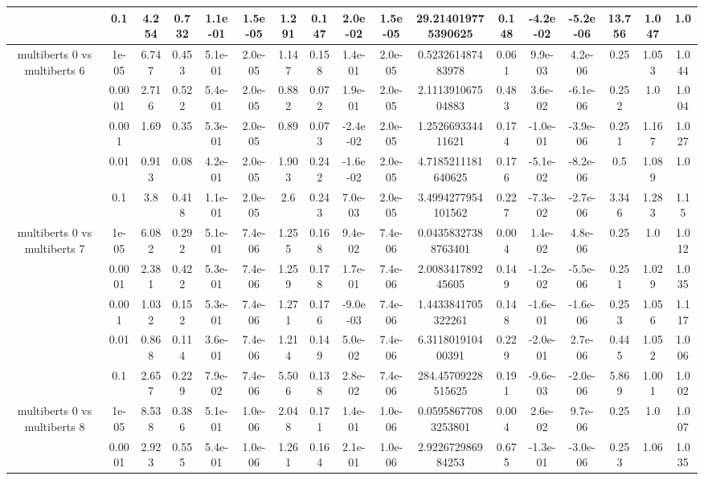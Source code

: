 \begin{tabular}{|c|c|c|c|c|c|c|c|c|c|c|c|c|c|c|c|c|}
 & 0.1 & 4.254 & 0.732 & 1.1e-01 & 1.5e-05 & 1.291 & 0.147 & 2.0e-02 & 1.5e-05 & 29.214019775390625 & 0.148 & -4.2e-02 & -5.2e-06 & 13.756 & 1.047 & 1.0 \\
\hline
\multirow{5}{*}{multiberts 0 vs multiberts 6} & 1e-05 & 6.747 & 0.453 & 5.1e-01 & 2.0e-05 & 1.147 & 0.158 & 1.4e-01 & 2.0e-05 & 0.523261487483978 & 0.061 & 9.9e-03 & 4.2e-06 & 0.25 & 1.053 & 1.044 \\
 & 0.0001 & 2.716 & 0.522 & 5.4e-01 & 2.0e-05 & 0.882 & 0.072 & 1.9e-01 & 2.0e-05 & 2.111391067504883 & 0.483 & 3.6e-02 & -6.1e-06 & 0.252 & 1.0 & 1.004 \\
 & 0.001 & 1.69 & 0.35 & 5.3e-01 & 2.0e-05 & 0.89 & 0.073 & -2.4e-02 & 2.0e-05 & 1.252669334411621 & 0.174 & -1.0e-01 & -3.9e-06 & 0.251 & 1.167 & 1.027 \\
 & 0.01 & 0.913 & 0.08 & 4.2e-01 & 2.0e-05 & 1.903 & 0.242 & -1.6e-02 & 2.0e-05 & 4.7185211181640625 & 0.176 & -5.1e-02 & -8.2e-06 & 0.5 & 1.089 & 1.0 \\
 & 0.1 & 3.8 & 0.418 & 1.1e-01 & 2.0e-05 & 2.6 & 0.243 & 7.0e-03 & 2.0e-05 & 3.4994277954101562 & 0.227 & -7.3e-02 & -2.7e-06 & 3.346 & 1.283 & 1.15 \\
\hline
\multirow{5}{*}{multiberts 0 vs multiberts 7} & 1e-05 & 6.082 & 0.292 & 5.1e-01 & 7.4e-06 & 1.255 & 0.168 & 9.4e-02 & 7.4e-06 & 0.04358327388763401 & 0.004 & 1.4e-02 & 4.8e-06 & 0.25 & 1.0 & 1.012 \\
 & 0.0001 & 2.381 & 0.422 & 5.3e-01 & 7.4e-06 & 1.259 & 0.178 & 1.7e-01 & 7.4e-06 & 2.008341789245605 & 0.149 & -1.2e-02 & -5.5e-06 & 0.251 & 1.029 & 1.035 \\
 & 0.001 & 1.032 & 0.152 & 5.3e-01 & 7.4e-06 & 1.271 & 0.176 & -9.0e-03 & 7.4e-06 & 1.4433841705322261 & 0.148 & -1.6e-01 & -1.6e-06 & 0.253 & 1.056 & 1.117 \\
 & 0.01 & 0.868 & 0.114 & 3.6e-01 & 7.4e-06 & 1.214 & 0.149 & 5.0e-02 & 7.4e-06 & 6.311801910400391 & 0.229 & -2.0e-01 & 2.7e-06 & 0.445 & 1.052 & 1.006 \\
 & 0.1 & 2.657 & 0.229 & 7.9e-02 & 7.4e-06 & 5.506 & 0.138 & 2.8e-02 & 7.4e-06 & 284.45709228515625 & 0.191 & -9.6e-03 & -2.0e-06 & 5.869 & 1.001 & 1.002 \\
\hline
\multirow{5}{*}{multiberts 0 vs multiberts 8} & 1e-05 & 8.538 & 0.386 & 5.1e-01 & 1.0e-06 & 2.048 & 0.171 & 1.4e-01 & 1.0e-06 & 0.05958677083253801 & 0.004 & 2.6e-02 & 9.7e-06 & 0.25 & 1.0 & 1.007 \\
 & 0.0001 & 2.923 & 0.555 & 5.4e-01 & 1.0e-06 & 1.261 & 0.164 & 2.1e-01 & 1.0e-06 & 2.922672986984253 & 0.675 & -1.3e-01 & -3.0e-06 & 0.253 & 1.06 & 1.035 \\

\end{tabular}
